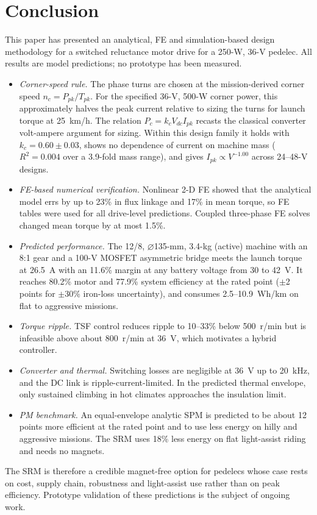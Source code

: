 \documentclass[journal]{IEEEtran}
\begin{document}
\section{Conclusion}
This paper has presented an analytical, FE and simulation-based design
methodology for a switched reluctance motor drive for a 250-W, 36-V pedelec.
All results are model predictions; no prototype has been measured.
\begin{itemize}
\item \emph{Corner-speed rule.} The phase turns are chosen at the
mission-derived corner speed $n_c=P_{pk}/T_{pk}$. For the specified 36-V, 500-W
corner power, this approximately halves the peak current relative to sizing
the turns for launch torque at 25~km/h. The relation $P_c=k_cV_{dc}I_{pk}$
recasts the classical converter volt-ampere argument for sizing. Within this
design family it holds with $k_c=0.60\pm0.03$, shows no dependence of current
on machine mass ($R^2=0.004$ over a 3.9-fold mass range), and gives
$I_{pk}\propto V^{-1.00}$ across 24--48-V designs.
\item \emph{FE-based numerical verification.} Nonlinear 2-D FE showed that the
analytical model errs by up to 23\% in flux linkage and 17\% in mean torque, so
FE tables were used for all drive-level predictions. Coupled three-phase FE
solves changed mean torque by at most 1.5\%.
\item \emph{Predicted performance.} The 12/8, $\varnothing$135-mm, 3.4-kg
(active) machine with an 8:1 gear and a 100-V MOSFET asymmetric bridge meets
the launch torque at 26.5~A with an 11.6\% margin at any battery voltage from
30 to 42~V. It reaches 80.2\% motor and 77.9\% system efficiency at the rated
point ($\pm$2 points for $\pm$30\% iron-loss uncertainty), and consumes
2.5--10.9~Wh/km on flat to aggressive missions.
\item \emph{Torque ripple.} TSF control reduces ripple to 10--33\% below
500~r/min but is infeasible above about 800~r/min at 36~V, which motivates a
hybrid controller.
\item \emph{Converter and thermal.} Switching losses are negligible at 36~V up to
20~kHz, and the DC link is ripple-current-limited. In the predicted thermal
envelope, only sustained climbing in hot climates approaches the insulation
limit.
\item \emph{PM benchmark.} An equal-envelope analytic SPM is predicted to be
about 12 points more efficient at the rated point and to use less energy on
hilly and aggressive missions. The SRM uses 18\% less energy on flat
light-assist riding and needs no magnets.
\end{itemize}
The SRM is therefore a credible magnet-free option for pedelecs whose case
rests on cost, supply chain, robustness and light-assist use rather than on
peak efficiency. Prototype validation of these predictions is the subject of
ongoing work.



\end{document}
